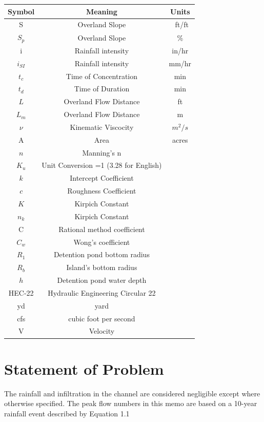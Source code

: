 \documentclass[11pt,letterpaper,final]{report}
\begin{document}
\begin{flushleft}
\begin{table}[htbp]
\centering
\begin{tabular}{ccc}
\textbf{Symbol} & \textbf{Meaning} & \textbf{Units} \\
\hline
S&Overland Slope & \ ft/ft\\
$S_p$ &Overland Slope & \% \\
i & Rainfall intensity & in/hr\\
$i_{SI}$ & Rainfall intensity &mm/hr\\
$t_c$& Time of Concentration& min\\
$t_d$& Time of Duration& min\\
$L$& Overland Flow Distance& ft\\
$L_m$& Overland Flow Distance& m\\
$\nu$ & Kinematic Viscocity & $m^2/s$ \\
A & Area & acres\\
$n$& Manning's n &\\
$K_u$& Unit Conversion =1 (3.28 for English)& \\
$k$& Intercept Coefficient& \\
$c$& Roughness Coefficient & \\
$K$& Kirpich Constant & \\
$n_k$& Kirpich Constant & \\
C& Rational method coefficient&\\
$C_{w}$& Wong's coefficient& \\
$R_1$& Detention pond bottom radius& \\
$R_b$& Island's bottom radius& \\
$h$ & Detention pond water depth\\
HEC-22 & Hydraulic Engineering Circular 22\\


yd & yard\\
cfs & cubic foot per second\\
V & Velocity & \\ \hline
\end{tabular} 
\end{table}



\setcounter{chapter}{0}
\setcounter{figure}{0}
\setcounter{section}{0}



\chapter{Statement of Problem}
\setcounter{page}{0}
The rainfall and infiltration in the channel are considered negligible except where otherwise specified. The peak flow numbers in this memo are based on a 10-year rainfall event described by Equation 1.1


\end{flushleft}
\end{document}
